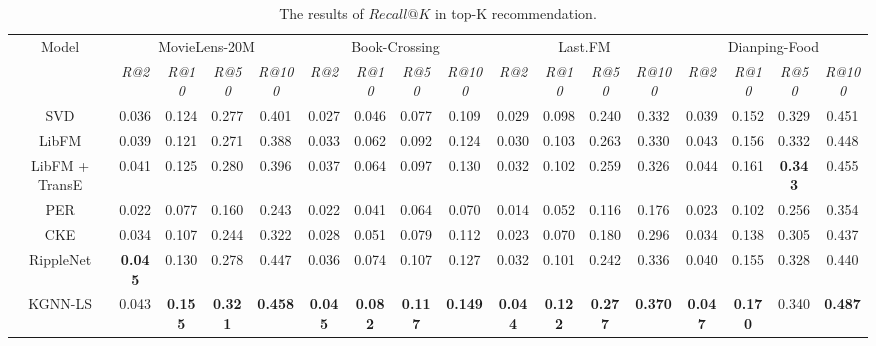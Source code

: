 \documentclass[sigconf]{acmart}
\begin{document}
    		\begin{table*}[t]
    			\centering
    			\setlength{\tabcolsep}{2pt}
    			\begin{tabular}{c|cccc|cccc|cccc|cccc}
    				\hline
    				\multirow{2}{*}{Model} & \multicolumn{4}{c|}{MovieLens-20M} & \multicolumn{4}{c|}{Book-Crossing} & \multicolumn{4}{c|}{Last.FM} & \multicolumn{4}{c}{Dianping-Food} \\
            		& \multicolumn{1}{c}{\textit{R@2}} & \multicolumn{1}{c}{\textit{R@10}} & \multicolumn{1}{c}{\textit{R@50}} & \multicolumn{1}{c|}{\textit{R@100}} & \multicolumn{1}{c}{\textit{R@2}} & \multicolumn{1}{c}{\textit{R@10}} & \multicolumn{1}{c}{\textit{R@50}} & \multicolumn{1}{c|}{\textit{R@100}} & \multicolumn{1}{c}{\textit{R@2}} & \multicolumn{1}{c}{\textit{R@10}} & \multicolumn{1}{c}{\textit{R@50}} & \multicolumn{1}{c|}{\textit{R@100}} & \multicolumn{1}{c}{\textit{R@2}} & \multicolumn{1}{c}{\textit{R@10}} & \multicolumn{1}{c}{\textit{R@50}} & \multicolumn{1}{c}{\textit{R@100}} \\
            		\hline
            		SVD & 0.036 & 0.124 & 0.277 & 0.401 & 0.027 & 0.046 & 0.077 & 0.109 & 0.029 & 0.098 & 0.240 & 0.332 & 0.039 & 0.152 & 0.329 & 0.451 \\
            		LibFM & 0.039 & 0.121 & 0.271 & 0.388 & 0.033 & 0.062 & 0.092 & 0.124 & 0.030 & 0.103 & 0.263 & 0.330 & 0.043 & 0.156 & 0.332 & 0.448 \\
            		LibFM + TransE & 0.041 & 0.125 & 0.280 & 0.396 & 0.037 & 0.064 & 0.097 & 0.130 & 0.032 & 0.102 & 0.259 & 0.326 & 0.044 & 0.161 & \textbf{0.343} & 0.455 \\
            		PER & 0.022 & 0.077 & 0.160 & 0.243 & 0.022 & 0.041 & 0.064 & 0.070 & 0.014 & 0.052 & 0.116 & 0.176 & 0.023 & 0.102 & 0.256 & 0.354 \\
            		CKE & 0.034 & 0.107 & 0.244 & 0.322 & 0.028 & 0.051 & 0.079 & 0.112 & 0.023 & 0.070 & 0.180 & 0.296 & 0.034 & 0.138 & 0.305 & 0.437 \\
            		RippleNet & \textbf{0.045} & 0.130 & 0.278 & 0.447 & 0.036 & 0.074 & 0.107 & 0.127 & 0.032 & 0.101 & 0.242 & 0.336 & 0.040 & 0.155 & 0.328 & 0.440 \\
            		\hline
            		KGNN-LS & 0.043 & \textbf{0.155} & \textbf{0.321} & \textbf{0.458} & \textbf{0.045} & \textbf{0.082} & \textbf{0.117} & \textbf{0.149} & \textbf{0.044} & \textbf{0.122} & \textbf{0.277} & \textbf{0.370} & \textbf{0.047} & \textbf{0.170} & 0.340 & \textbf{0.487} \\
            		\hline
				\end{tabular}
				\vspace{0.05in}
				\caption{The results of $Recall@K$ in top-K recommendation.}
				\label{table:topk}
				\vspace{-0.1in}
			\end{table*}
			
\end{document}
